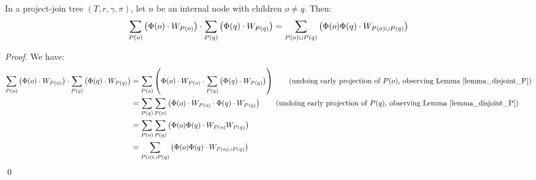 \begin{lemma}
\label{lemma_late_proj}
    In a project-join tree $(T, r, \gamma, \pi)$, let $n$ be an internal node with children $o \ne q$.
    Then:
    $$\sum_{P(o)} \left(  \Phi(o) \cdot W_{P(o)}  \right) \cdot \sum_{P(q)} \left(  \Phi(q) \cdot W_{P(q)}  \right) = \sum_{P(o) \cup P(q)} \left(  \Phi(o) \Phi(q) \cdot W_{P(o) \cup P(q)}  \right)$$
\end{lemma}
\begin{proof}
    We have:
    \begin{align*}
        \proj_{P(o)} \pars{ \Phi(o) \mult W_{P(o)} } \mult \proj_{P(q)} \pars{ \Phi(q) \mult W_{P(q)} }
        & = \proj_{P(o)} \pars{ \Phi(o) \mult W_{P(o)} \mult \proj_{P(q)} \pars{ \Phi(q) \mult W_{P(q)} } } \tag{undoing early projection of $P(o)$, observing Lemma \ref{lemma_disjoint_P}} \\
        & = \proj_{P(q)} \proj_{P(o)} \pars{ \Phi(o) \mult W_{P(o)} \mult \Phi(q) \mult W_{P(q)} } \tag{undoing early projection of $P(q)$, observing Lemma \ref{lemma_disjoint_P}} \\
        & = \proj_{P(o)} \proj_{P(q)} \pars{ \Phi(o) \Phi(q) \mult W_{P(o)} W_{P(q)} }
        \\
        & = \proj_{P(o) \cup P(q)} \pars{ \Phi(o) \Phi(q) \mult W_{P(o) \cup P(q)} }
    \end{align*}
\qed
\end{proof}

\pagebreak

